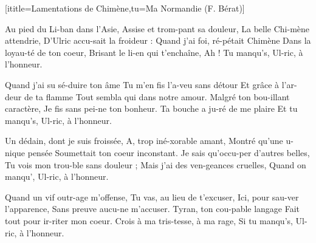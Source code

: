 [ititle={Lamentations de Chimène},tu={Ma Normandie (F. Bérat)}]

\beginverse
Au pied du Li-ban dans l'Asie,
Assise et trom-pant sa douleur,
La belle Chi-mène attendrie,
D'Ulric accu-sait la froideur :
Quand j'ai foi, ré-pétait Chimène
Dans la loyau-té de ton coeur,
Brisant le li-en qui t'enchaîne,
Ah ! Tu manqu's, Ul-ric, à l'honneur.
\endverse

\beginverse
Quand j'ai su sé-duire ton âme
Tu m'en fis l'a-veu sans détour
Et grâce à l'ar-deur de ta flamme
Tout sembla qui dans notre amour.
Malgré ton bou-illant caractère,
Je fis sans pei-ne ton bonheur.
Ta bouche a ju-ré de me plaire
Et tu manqu's, Ul-ric, à l'honneur.
\endverse

\beginverse
Un dédain, dont je suis froissée,
A, trop iné-xorable amant,
Montré qu'une u-nique pensée
Soumettait ton coeur inconstant.
Je sais qu'occu-per d'autres belles,
Tu vois mon trou-ble sans douleur ;
Mais j'ai des ven-geances cruelles,
Quand on manqu', Ul-ric, à l'honneur.
\endverse

\beginverse
Quand un vif outr-age m'offense,
Tu vas, au lieu de t'excuser,
Ici, pour sau-ver l'apparence,
Sans preuve aucu-ne m'accuser.
Tyran, ton cou-pable langage
Fait tout pour ir-riter mon coeur.
Crois à ma tris-tesse, à ma rage,
Si tu manqu's, Ul-ric, à l'honneur.
\endverse
\endsong